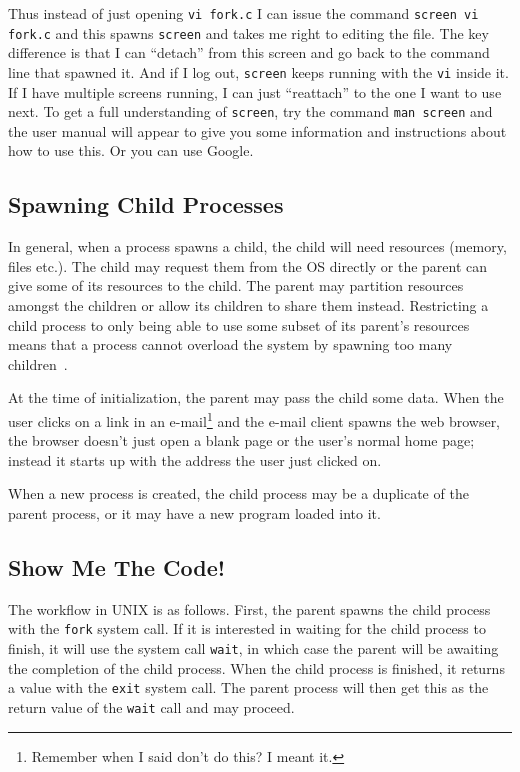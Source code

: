 Thus instead of just opening \texttt{vi fork.c} I can issue the command \texttt{screen vi fork.c} and this spawns \texttt{screen} and takes me right to editing the file. The key difference is that I can ``detach'' from this screen and go back to the command line that spawned it. And if I log out, \texttt{screen} keeps running with the \texttt{vi} inside it. If I have multiple screens running, I can just ``reattach'' to the one I want to use next. To get a full understanding of \texttt{screen}, try the command \texttt{man screen} and the user manual will appear to give you some information and instructions about how to use this. Or you can use Google.

\subsection*{Spawning Child Processes}

In general, when a process spawns a child, the child will need resources (memory, files etc.). The child may request them from the OS directly or the parent can give some of its resources to the child. The parent may partition resources amongst the children or allow its children to share them instead. Restricting a child process to only being able to use some subset of its parent's resources means that a process cannot overload the system by spawning too many children~\cite{osc}.

At the time of initialization, the parent may pass the child some data. When the user clicks on a link in an e-mail\footnote{Remember when I said don't do this? I meant it.} and the e-mail client spawns the web browser, the browser doesn't just open a blank page or the user's normal home page; instead it starts up with the address the user just clicked on.

When a new process is created, the child process may be a duplicate of the parent process, or it may have a new program loaded into it.


\subsection*{Show Me The Code!}

The workflow in UNIX is as follows. First, the parent spawns the child process with the \texttt{fork} system call. If it is interested in waiting for the child process to finish, it will use the system call \texttt{wait}, in which case the parent will be awaiting the completion of the child process. When the child process is finished, it returns a value with the \texttt{exit} system call. The parent process will then get this as the return value of the \texttt{wait} call and may proceed.

